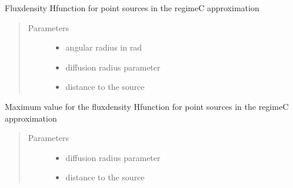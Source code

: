 \documentclass[letterpaper,10pt,english]{sphinxmanual}
\begin{document}
\begin{fulllineitems}
\label{\detokenize{diffsph.profiles:diffsph.profiles.analytics.psfdC}}
\sphinxAtStartPar
Flux\sphinxhyphen{}density H\sphinxhyphen{}function for point sources in the regime\sphinxhyphen{}C approximation
\begin{quote}\begin{description}
\item[{Parameters}] \leavevmode\begin{itemize}
\item {} 
\sphinxAtStartPar
{} \textendash{} angular radius in rad

\item {} 
\sphinxAtStartPar
{} \textendash{} diffusion radius parameter

\item {} 
\sphinxAtStartPar
{} \textendash{} distance to the source

\end{itemize}

\end{description}\end{quote}

\end{fulllineitems}


\begin{fulllineitems}
\label{\detokenize{diffsph.profiles:diffsph.profiles.analytics.psfdCmax}}
\sphinxAtStartPar
Maximum value for the flux\sphinxhyphen{}density H\sphinxhyphen{}function for point sources in the regime\sphinxhyphen{}C approximation
\begin{quote}\begin{description}
\item[{Parameters}] \leavevmode\begin{itemize}
\item {} 
\sphinxAtStartPar
{} \textendash{} diffusion radius parameter

\item {} 
\sphinxAtStartPar
{} \textendash{} distance to the source

\end{itemize}

\end{description}\end{quote}

\end{fulllineitems}
\end{document}
